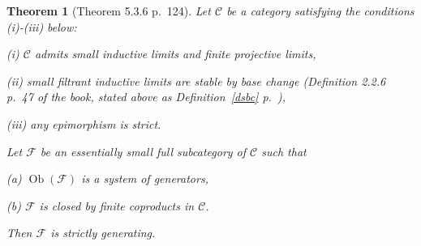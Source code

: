 \documentclass[12pt]{article}
\newtheorem{thm}{Theorem}
\theoremstyle{remark}
\theoremstyle{definition}
\newcommand{\nn}{\noindent}
\newcommand{\C}{\mathcal C}
\newcommand{\F}{\mathcal F}
\DeclareMathOperator{\Ob}{Ob}
\begin{document}
\begin{thm}[Theorem 5.3.6 p.~124]\label{536} 
Let $\C$ be a category satisfying the conditions \emph{(i)-(iii)} below:

\nn\emph{(i)} $\C$ admits small inductive limits and finite projective limits, 

\nn\emph{(ii)} small filtrant inductive limits are stable by base change (Definition 2.2.6 p.~47 of the book, stated above as Definition~\ref{dsbc} p.~\pageref{dsbc}), 

\nn\emph{(iii)} any epimorphism is strict. 

\nn Let $\F$ be an essentially small full subcategory of $\C$ such that 

\nn\emph{(a)} $\Ob(\F)$ is a system of generators,

\nn\emph{(b)} $\F$ is closed by finite coproducts in $\C$. 

\nn Then $\F$ is strictly generating.
\end{thm}
\end{document}
